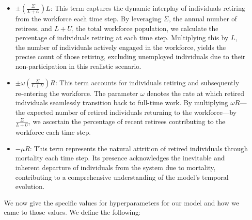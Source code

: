 \documentclass{article}
\begin{document}
\begin{itemize}
    \item $\pm\left(\frac{\Sigma}{L + U}\right) L$: This term captures the dynamic interplay of individuals retiring from the workforce each time step. By leveraging $\Sigma$, the annual number of retirees, and $L + U$, the total workforce population, we calculate the percentage of individuals retiring at each time step. Multiplying this by $L$, the number of individuals actively engaged in the workforce, yields the precise count of those retiring, excluding unemployed individuals due to their non-participation in this realistic scenario.

    \item $\pm \omega\left(\frac{\Sigma}{L + U}\right) R$: This term accounts for individuals retiring and subsequently re-entering the workforce. The parameter $\omega$ denotes the rate at which retired individuals seamlessly transition back to full-time work. By multiplying $\omega R$—the expected number of retired individuals returning to the workforce—by $\frac{\Sigma}{L + U}$, we ascertain the percentage of recent retirees contributing to the workforce each time step.

    \item $-\mu R$: This term represents the natural attrition of retired individuals through mortality each time step. Its presence acknowledges the inevitable and inherent departure of individuals from the system due to mortality, contributing to a comprehensive understanding of the model's temporal evolution.
\end{itemize}


We now give the specific values for hyperparameters for our model and how we came to those values. We define the following:
\end{document}
